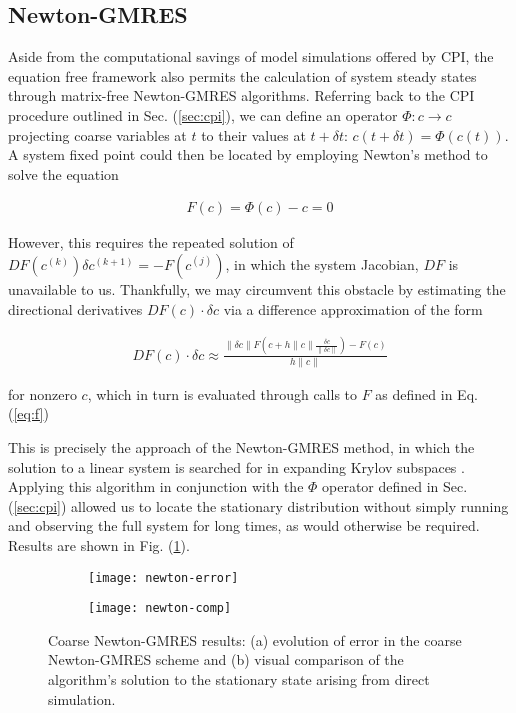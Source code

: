 \documentclass[epjST, final]{svjour}
\begin{document}
\begin{onehalfspace}
\section{Newton-GMRES}

Aside from the computational savings of model simulations offered by CPI, the equation free framework also permits the calculation of system steady states through matrix-free Newton-GMRES algorithms. Referring back to the CPI procedure outlined in Sec. (\ref{sec:cpi}), we can define an operator $\Phi: c \rightarrow c$ projecting coarse variables at $t$ to their values at $t + \delta t$: $c(t+\delta t) =\Phi(c(t))$. A system fixed point could then be located by employing Newton's method to solve the equation

\begin{align}
\label{eq:f}
F(c) = \Phi(c) - c = 0
\end{align}

However, this requires the repeated solution of $DF(c^{(k)}) \delta c^{(k+1)} = -F(c^{(j)})$, in which the system Jacobian, $DF$ is unavailable to us. Thankfully, we may circumvent this obstacle by estimating the directional derivatives $DF(c) \cdot \delta c$ via a difference approximation of the form

\begin{align}
  DF(c) \cdot \delta c \approx \frac{\| \delta c \| F(c + h \| c \| \frac{\delta c}{\| \delta c \|}) - F(c)}{h \| c \|}
\end{align}

for nonzero $c$, which in turn is evaluated through calls to $F$ as defined in Eq. (\ref{eq:f})

This is precisely the approach of the Newton-GMRES method, in which the solution to a linear system is searched for in expanding Krylov subspaces \cite{kelley_solving_2003}. Applying this algorithm in conjunction with the $\Phi$ operator defined in Sec. (\ref{sec:cpi}) allowed us to locate the stationary distribution without simply running and observing the full system for long times, as would otherwise be required. Results are shown in Fig. (\ref{fig:newton-results}).

\begin{figure}[h!]
  \vspace{-5mm}
  \centering
  \begin{subfigure}{0.49\textwidth}
    \centering
    \texttt{[image: newton-error]}
    \subcaption{\label{fig:newton-error}}
  \end{subfigure} %
  \begin{subfigure}{0.49\textwidth}
    \centering
    \texttt{[image: newton-comp]}
    \subcaption{\label{fig:newton-comp}}
  \end{subfigure}%
  \caption{Coarse Newton-GMRES results: (a) evolution of error in the
    coarse Newton-GMRES scheme and (b) visual comparison of the
    algorithm's solution to the stationary state arising from direct
    simulation. \label{fig:newton-results}}
\end{figure}



\end{onehalfspace}
\end{document}
